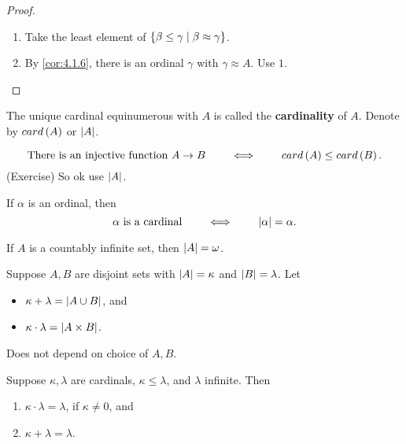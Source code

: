 \begin{proof}
\hfill
\begin{enumerate}
\item Take the least element of $ \left\{ \beta \le \gamma \mid \beta \approx \gamma \right\} $.
\item By \ref{cor:4.1.6}, there is an ordinal $ \gamma $ with $ \gamma \approx A $. Use $ 1 $.
\end{enumerate}
\end{proof}

\begin{definition}
The unique cardinal equinumerous with $ A $ is called the \textbf{cardinality} of $ A $. Denote by $ card\left( A \right) $ or $ \left\lvert A \right\rvert $.
\end{definition}

\begin{remark2}
$$ \text{There is an injective function} \ A \to B \qquad \iff \qquad card\rb{A} \le card\rb{B}. $$
(Exercise) So ok use $ \left\lvert A \right\rvert $.
\end{remark2}

If $ \alpha $ is an ordinal, then
$$ \alpha \ \text{is a cardinal} \qquad \iff \qquad \left\lvert \alpha \right\rvert = \alpha. $$

\begin{example2}
If $ A $ is a countably infinite set, then $ \left\lvert A \right\rvert = \omega $.
\end{example2}

\begin{definition}
Suppose $ A, B $ are disjoint sets with $ \left\lvert A \right\rvert = \kappa $ and $ \left\lvert B \right\rvert = \lambda $. Let
\begin{itemize}
\item $ \kappa + \lambda = \left\lvert A \cup B \right\rvert $, and
\item $ \kappa \cdot \lambda = \left\lvert A \times B \right\rvert $.
\end{itemize}
\end{definition}

\begin{remark2}
Does not depend on choice of $ A, B $.
\end{remark2}

\begin{theorem}
\label{thm:4.2.5}
Suppose $ \kappa, \lambda $ are cardinals, $ \kappa \le \lambda $, and $ \lambda $ infinite. Then
\begin{enumerate}
\item $ \kappa \cdot \lambda = \lambda $, if $ \kappa \ne 0 $, and
\item $ \kappa + \lambda = \lambda $.
\end{enumerate}
\end{theorem}

